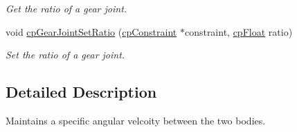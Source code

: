 \begin{DoxyCompactItemize}
\begin{DoxyCompactList}\small\item\em Get the ratio of a gear joint. \end{DoxyCompactList}\item 
\hypertarget{group__cp_gear_joint_gacc827f7adbfb549ec1f01a83b4f9459e}{}void \hyperlink{group__cp_gear_joint_gacc827f7adbfb549ec1f01a83b4f9459e}{cp\+Gear\+Joint\+Set\+Ratio} (\hyperlink{structcp_constraint}{cp\+Constraint} $\ast$constraint, \hyperlink{group__basic_types_gac1ed65573e035bf892505768c852d8d3}{cp\+Float} ratio)\label{group__cp_gear_joint_gacc827f7adbfb549ec1f01a83b4f9459e}

\begin{DoxyCompactList}\small\item\em Set the ratio of a gear joint. \end{DoxyCompactList}\end{DoxyCompactItemize}


\subsection{Detailed Description}
Maintains a specific angular velcoity between the two bodies. 

